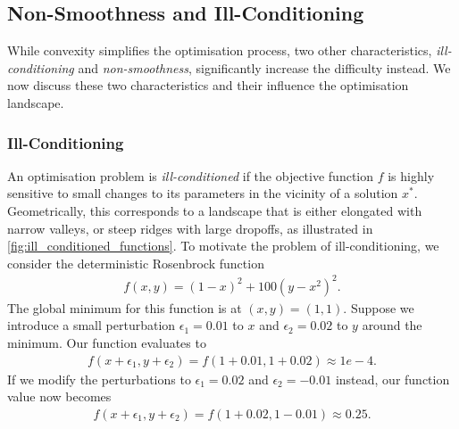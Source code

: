 \subsection{Non-Smoothness and Ill-Conditioning}
\label{ssec:ill_conditioning_nonsmooth}

While convexity simplifies the optimisation process, two other characteristics, \textit{ill-conditioning} and \textit{non-smoothness}, significantly increase the difficulty instead. We now discuss these two characteristics and their influence the optimisation landscape.


\subsubsection{Ill-Conditioning}
\label{sssec:ill_conditioning}

An optimisation problem is \textit{ill-conditioned} if the objective function $f$ is highly sensitive to small changes to its parameters in the vicinity of a solution $x^*$. Geometrically, this corresponds to a landscape that is either elongated with narrow valleys, or steep ridges with large dropoffs, as illustrated in \cref{fig:ill_conditioned_functions}. To motivate the problem of ill-conditioning, we consider the deterministic Rosenbrock function
\begin{align}
    f(x,y) = (1 - x)^2 + 100(y - x^2)^2.
    \label{eq:rosenbrock_function}
\end{align}
The global minimum for this function is at $(x,y) = (1,1)$. Suppose we introduce a small perturbation $\epsilon_1 = 0.01$ to $x$ and $\epsilon_2 = 0.02$ to $y$ around the minimum. Our function evaluates to
\begin{align}
    f(x + \epsilon_1, y + \epsilon_2) = f(1 + 0.01, 1 + 0.02)
    \approx 1e-4.
\end{align}
If we modify the perturbations to $\epsilon_1 = 0.02$ and $\epsilon_2 = -0.01$ instead, our function value now becomes
\begin{align}
    f(x + \epsilon_1, y + \epsilon_2) = f(1 + 0.02, 1 - 0.01)
    \approx 0.25.
\end{align}

